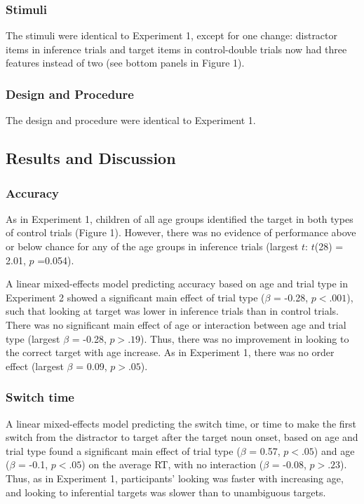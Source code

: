 \documentclass[a4paper,man,apacite,floatsintext]{apa6}
\begin{document}
\subsubsection{Stimuli}\label{stimuli}

The stimuli were identical to Experiment 1, except for one change:
distractor items in inference trials and target items in control-double
trials now had three features instead of two (see bottom panels in
Figure 1).

\subsubsection{Design and Procedure}\label{design-and-procedure}

The design and procedure were identical to Experiment 1.

\subsection{Results and Discussion}\label{results-and-discussion}

\subsubsection{Accuracy}\label{accuracy-1}

As in Experiment 1, children of all age groups identified the target in
both types of control trials (Figure 1). However, there was no evidence
of performance above or below chance for any of the age groups in
inference trials (largest \(t\): \(t\)(28) = 2.01, \(p\) =0.054).

A linear mixed-effects model predicting accuracy based on age and trial
type in Experiment 2 showed a significant main effect of trial type
(\(\beta\) = -0.28, \(p <.001\)), such that looking at target was lower
in inference trials than in control trials. There was no significant
main effect of age or interaction between age and trial type (largest
\(\beta\) = -0.28, \(p >.19\)). Thus, there was no improvement in
looking to the correct target with age increase. As in Experiment 1,
there was no order effect (largest \(\beta\) = 0.09, \(p >.05\)).

\subsubsection{Switch time}\label{switch-time-1}

A linear mixed-effects model predicting the switch time, or time to make
the first switch from the distractor to target after the target noun
onset, based on age and trial type found a significant main effect of
trial type (\(\beta\) = 0.57, \(p <.05\)) and age (\(\beta\) = -0.1,
\(p <.05\)) on the average RT, with no interaction (\(\beta\) = -0.08,
\(p >.23\)). Thus, as in Experiment 1, participants' looking was faster
with increasing age, and looking to inferential targets was slower than
to unambiguous targets.
\end{document}
